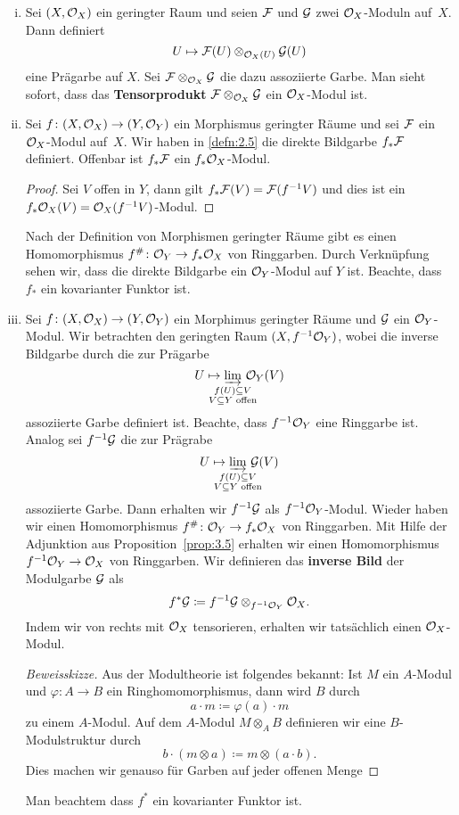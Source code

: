 \begin{kons}
	\begin{enumerate}[i)]
		\item Sei $(X,\mathcal{O}_X)$ ein geringter Raum und seien $\mathcal{F}$ und $\mathcal{G}$ zwei $\mathcal{O}_X$-Moduln auf~$X$. Dann definiert
		\[
			U \mapsto \mathcal{F}(U)\otimes_{\mathcal{O}_X(U)}\mathcal{G}(U)
		\]
		eine Prägarbe auf $X$. Sei $\mathcal{F}\otimes_{\mathcal{O}_X} \mathcal{G}$ die dazu assoziierte Garbe. Man sieht sofort, dass das \textbf{Tensorprodukt} $\mathcal{F}\otimes_{\mathcal{O}_X} \mathcal{G}$ ein $\mathcal{O}_X$-Modul ist.
		\item Sei $f\colon(X,\mathcal{O}_X)\to(Y,\mathcal{O}_Y)$ ein Morphismus geringter Räume und sei $\mathcal{F}$ ein $\mathcal{O}_X$-Modul auf~$X$. Wir haben in \ref{defn:2.5} die direkte Bildgarbe $f_*\mathcal{F}$ definiert. Offenbar ist $f_*\mathcal{F}$ ein $f_*\mathcal{O}_X$-Modul.
		\begin{proof}
			Sei $V$ offen in $Y$, dann gilt $f_*\mathcal{F}(V) = \mathcal{F}(f^{-1}V)$ und dies ist ein $f_*\mathcal{O}_X(V) = \mathcal{O}_X(f^{-1}V)$-Modul.
		\end{proof}
		Nach der Definition von Morphismen geringter Räume gibt es einen Homomorphismus $f^{\#}\colon \mathcal{O}_Y \to f_*\mathcal{O}_X$ von Ringgarben. Durch Verknüpfung sehen wir, dass die direkte Bildgarbe ein $\mathcal{O}_Y$-Modul auf $Y$ ist. Beachte, dass $f_*$ ein kovarianter Funktor ist.
		\item Sei $f\colon (X,\mathcal{O}_X) \to (Y,\mathcal{O}_Y)$ ein Morphimus geringter Räume und $\mathcal{G}$ ein $\mathcal{O}_Y$-Modul. Wir betrachten den geringten Raum $(X, f^{-1}\mathcal{O}_Y)$, wobei die inverse Bildgarbe durch die zur Prägarbe
		\[
                        U \mapsto \varinjlim_{\substackclap{f(U)\subseteq V\\V\subseteq Y \text{ offen}}} \, \mco_Y(V)
		\]
		assoziierte Garbe definiert ist. Beachte, dass $f^{-1}\mathcal{O}_Y$ eine Ringgarbe ist. Analog sei $f^{-1}\mathcal{G}$ die zur Prägrabe
		\[
                        U \mapsto \varinjlim_{\substackclap{f(U)\subseteq V\\V\subseteq Y \text{ offen}}} \, \mathcal{G}(V)
		\]
		assoziierte Garbe. Dann erhalten wir $f^{-1}\mathcal{G}$ als $f^{-1}\mathcal{O}_Y$-Modul. Wieder haben wir einen Homomorphismus $f^{\#}\colon \mathcal{O}_Y \to f_*\mathcal{O}_X$ von Ringgarben. Mit Hilfe der Adjunktion aus Proposition~\ref{prop:3.5} erhalten wir einen Homomorphismus $f^{-1}\mathcal{O}_Y \to \mathcal{O}_X$ von Ringgarben. Wir definieren das \textbf{inverse Bild} der Modulgarbe $\mathcal{G}$ als
		\[
			f^*\mathcal{G} \coloneqq f^{-1}\mathcal{G} \otimes_{f^{-1}\mathcal{O}_Y}\mathcal{O}_X.
		\]
		Indem wir von rechts mit $\mathcal{O}_X$ tensorieren, erhalten wir tatsächlich einen $\mathcal{O}_X$-Modul.
                \begin{proof}[Beweisskizze]
			Aus der Modultheorie ist folgendes bekannt: Ist $M$ ein $A$-Modul und $\varphi\colon A \to B$ ein Ringhomomorphismus, dann wird $B$ durch
			\[
				a \cdot m \coloneqq \varphi(a) \cdot m
			\]
			zu einem $A$-Modul. Auf dem $A$-Modul $M\otimes_A B$ definieren wir eine $B$-Modulstruktur durch
			\[
				b\cdot(m\otimes a) \coloneqq m\otimes (a\cdot b).
			\]
			Dies machen wir genauso für Garben auf jeder offenen Menge
		\end{proof}
		Man beachtem dass $f^*$ ein kovarianter Funktor ist.
	\end{enumerate}
\end{kons}

